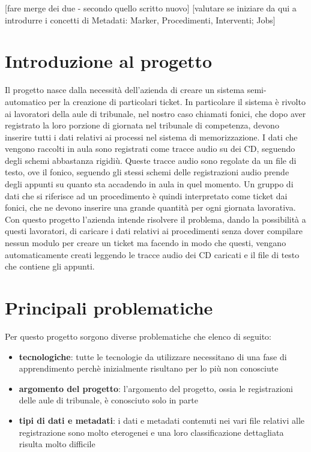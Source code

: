   [fare merge dei due - secondo quello scritto nuovo] [valutare se iniziare da qui a introdurre i concetti di Metadati: Marker, Procedimenti, Interventi; Jobs]
\section{Introduzione al progetto}

Il progetto nasce dalla necessità dell'azienda di creare un sistema semi-automatico per la creazione di particolari ticket. In particolare il sistema è rivolto ai lavoratori della aule di tribunale,
nel nostro caso chiamati fonici, che dopo aver registrato la loro porzione di giornata nel tribunale di competenza, devono inserire tutti i dati relativi ai processi nel sistema di memorizzazione.
I dati che vengono raccolti in aula sono registrati come tracce audio su dei CD, seguendo degli schemi abbastanza rigidiù. Queste tracce audio sono regolate da un file di testo, ove il fonico,
seguendo gli stessi schemi delle registrazioni audio prende degli appunti su quanto sta accadendo in aula in quel momento.
Un gruppo di dati che si riferisce ad un procedimento è quindi interpretato come ticket dai fonici, che ne devono inserire una grande quantità per ogni giornata lavorativa.
Con questo progetto l'azienda intende risolvere il problema, dando la possibilità a questi lavoratori, di caricare i dati relativi ai procedimenti senza dover compilare nessun modulo
per creare un ticket ma facendo in modo che questi, vengano automaticamente creati leggendo le tracce audio dei CD caricati e il file di testo che contiene gli appunti.

\section{Principali problematiche}

Per questo progetto sorgono diverse problematiche che elenco di seguito:

\begin{itemize}
  \item \textbf{tecnologiche}: tutte le tecnologie da utilizzare necessitano di una fase di apprendimento perchè inizialmente risultano per lo più non conosciute
  \item \textbf{argomento del progetto}: l'argomento del progetto, ossia le registrazioni delle aule di tribunale, è conosciuto solo in parte
  \item \textbf{tipi di dati e metadati}: i dati e metadati contenuti nei vari file relativi alle registrazione sono molto eterogenei e una loro classificazione dettagliata risulta molto difficile
\end{itemize}


